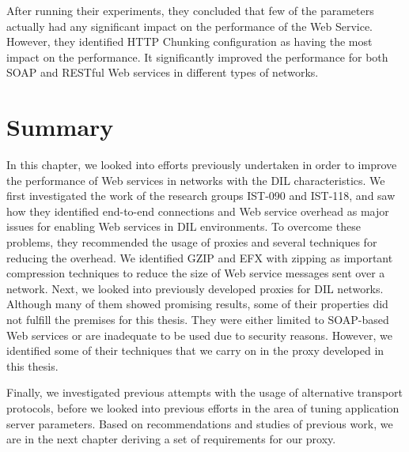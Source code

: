After running their experiments, they concluded that few of the parameters
actually had any significant impact on the performance of the Web Service.
However, they identified HTTP Chunking configuration as having the most impact
on the performance. It significantly improved the performance for both SOAP and
RESTful Web services in different types of networks.


\section{Summary}

In this chapter, we looked into efforts previously undertaken in order to
improve the performance of Web services in networks with the DIL
characteristics. We first investigated the work of the research groups IST-090
and IST-118, and saw how they identified end-to-end connections and Web service
overhead as major issues for enabling Web services in DIL environments. To
overcome these problems, they recommended the usage of proxies and several
techniques for reducing the overhead. We identified GZIP and EFX with zipping as
important compression techniques to reduce the size of Web service messages sent
over a network. Next, we looked into previously developed proxies for DIL
networks. Although many of them showed promising results, some of their
properties did not fulfill the premises for this thesis. They were either
limited to SOAP-based Web services or are inadequate to be used due to security
reasons. However, we identified some of their techniques that we carry on in the
proxy developed in this thesis.

Finally, we investigated previous attempts with the usage of alternative
transport protocols, before we looked into previous efforts in the area of
tuning application server parameters. Based on recommendations and studies of
previous work, we are in the next chapter deriving a set of requirements for our
proxy.
